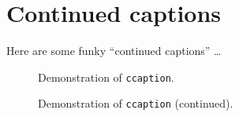 \chapter{Continued captions}
\label{chap:ContCaptions}

Here are some funky ``continued captions'' \cite{Kohler2007}\dots

\begin{figure}
  \subfloat[][Example 1a]{\label{fig:cc1a}\rule{3cm}{3cm}}
  \subfloat[][Example 1b]{\label{fig:cc1b}\rule{3cm}{3cm}}
  \subfloat[][Example 1c]{\label{fig:cc1c}\rule{3cm}{3cm}}
  \subfloat[][Example 1d]{\label{fig:cc1d}\rule{3cm}{3cm}}
  \caption{Demonstration of \texttt{ccaption}.}
  \label{fig:cc1}
\end{figure}

\begin{figure}
  \ContinuedFloat
  \subfloat[][Example 1e]{\label{fig:cc1e}\rule{3cm}{3cm}}
  \subfloat[][Example 1f]{\label{fig:cc1f}\rule{3cm}{3cm}}
  \subfloat[][Example 1g]{\label{fig:cc1g}\rule{3cm}{3cm}}
  \subfloat[][Example 1h]{\label{fig:cc1h}\rule{3cm}{3cm}}
  \caption[]{Demonstration of \texttt{ccaption} (continued).}
  \label{fig:cc2}
\end{figure}
